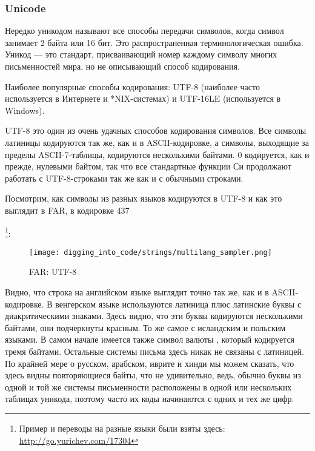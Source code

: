 \subsubsection{Unicode}

Нередко уникодом называют все способы передачи символов, когда символ занимает 2 байта или 16 бит.
Это распространенная терминологическая ошибка.
Уникод --- это стандарт, присваивающий номер каждому символу многих письменностей мира, но не описывающий
способ кодирования.

Наиболее популярные способы кодирования: 
UTF-8 (наиболее часто используется в Интернете и *NIX-системах) и UTF-16LE (используется в Windows).


UTF-8 это один из очень удачных способов кодирования символов.
Все символы латиницы кодируются так же, как и в ASCII-кодировке, а символы, выходящие за пределы
ASCII-7-таблицы, кодируются несколькими байтами.
0 кодируется, как и прежде, нулевыми байтом, так что все стандартные
функции Си продолжают работать с UTF-8-строками так же как и с обычными строками.

Посмотрим, как символы из разных языков кодируются в UTF-8 и как это выглядит в FAR, в кодировке 437

\footnote{Пример и переводы на разные языки были взяты здесь: 
\url{http://go.yurichev.com/17304}}:

\begin{figure}[H]
\centering
\texttt{[image: digging\_into\_code/strings/multilang\_sampler.png]}
\end{figure}

\begin{figure}[H]
\centering
{}
\caption{FAR: UTF-8}
\end{figure}

Видно, что строка на английском языке выглядит точно так же, как и в ASCII-кодировке.
В венгерском языке используются латиница плюс латинские буквы с диакритическими знаками.
Здесь видно, что эти буквы кодируются несколькими байтами, они подчеркнуты красным.
То же самое с исландским и польским языками.
В самом начале имеется также символ валюты , который кодируется тремя байтами.
Остальные системы письма здесь никак не связаны с латиницей.
По крайней мере о русском, арабском, иврите и хинди мы можем сказать, что здесь видны повторяющиеся
байты, что не удивительно, ведь, обычно буквы из одной и той же системы письменности расположены в одной
или нескольких таблицах уникода, поэтому часто их коды начинаются с одних и тех же цифр.

